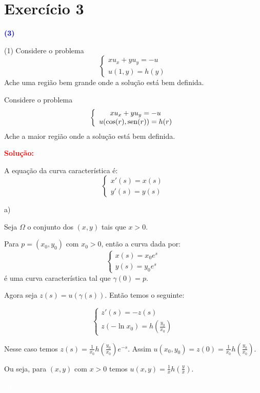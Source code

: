 \documentclass[11pt,a4paper]{article}
\newcommand{\exercicio}[1]{\section*{Exercício #1} \textcolor{blue}{\bf(#1)}}
\newcommand{\dividiritens}[1]{\begin{tasks}[counter-format={(tsk[a])},label-width=3.6ex, label-format = {\bfseries}, column-sep = {0pt}](1) #1 \end{tasks}}
\newcommand{\pers}[1]{\textcolor{Floresta}{$\negrito{(#1)} $}}
\newcommand{\solucao}[1]{\begin{mdframed}[style=MyFrame]
\textbf{\textcolor{red}{Solução:}} #1
\end{mdframed}\textcolor{white}{Oi} \newline}
\begin{document}
\exercicio{3}
\dividiritens{
\task[\pers{a}] Considere o problema
\[
\left\{\begin{array}{c}
xu_x + yu_y = -u \\
u(1,y) = h(y)
\end{array}
\right.
\]
Ache uma região bem grande onde a solução está bem definida.

\task[\pers{b}] Considere o problema
\[
\left\{\begin{array}{c}
xu_x + yu_y = -u \\
u(\cos(r), {\rm sen}(r)) = h(r)
\end{array}
\right.
\]
Ache a maior região onde a solução está bem definida.
}
\solucao{

\noindent
A equação da curva característica é:
\begin{equation*}
    \begin{cases}
    x'(s)=x(s) \\
    y'(s)=y(s)
    \end{cases}
\end{equation*}

\noindent
a)

\medskip
\noindent
Seja $\Omega$ o conjunto dos $(x,y)$ tais que $x>0$.

\smallskip
\noindent
Para $p=(x_0,y_0)$ com $x_0>0$, então a curva dada por:
\begin{equation*}
    \begin{cases}
    x(s)=x_0e^s \\
    y(s)=y_0e^s
    \end{cases}
\end{equation*}
é uma curva característica tal que $\gamma(0)=p$.

\smallskip
\noindent
Agora seja $z(s)=u(\gamma(s))$. Então temos o seguinte:

\begin{equation*}
    \begin{cases}
    z'(s)=-z(s) \\
    z(-\ln{x_0})=h\left(\frac{y_0}{x_0}\right)
    \end{cases}
\end{equation*}

\smallskip
\noindent
Nesse caso temos $z(s)=\frac{1}{x_0}h\left(\frac{y_0}{x_0}\right)e^{-s}$. Assim $u(x_0,y_0)=z(0)=\frac{1}{x_0}h\left(\frac{y_0}{x_0}\right)$.

\smallskip
\noindent
Ou seja, para $(x,y)$ com $x>0$ temos $u(x,y)=\frac{1}{x}h\left(\frac{y}{x}\right)$.

}
\end{document}
